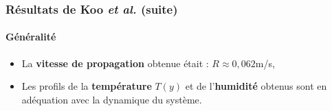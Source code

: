 \documentclass[handout]{beamer}
\newtheorem{pbm et hypo}[thm]{Problématique et hypothèses}
\begin{document}
	
	\begin{frame}
		\frametitle{\textbf{Résultats de {Koo \textit{et al.}} (suite)}}
			\framesubtitle{\textbf{Généralité}} 
		\pause
			\begin{itemize}
			\item La \textbf{vitesse de propagation} obtenue était  : \textbf{$R \approx 0{,}062$}m/s, 
				\vspace{0.5cm}
			\item Les profils de la \textbf{température} $T(y)$ et de l'\textbf{humidité} obtenus sont en adéquation avec la dynamique du système. \pause 
		\end{itemize}
		
	
	\end{frame}
%	
%				
\end{document}
